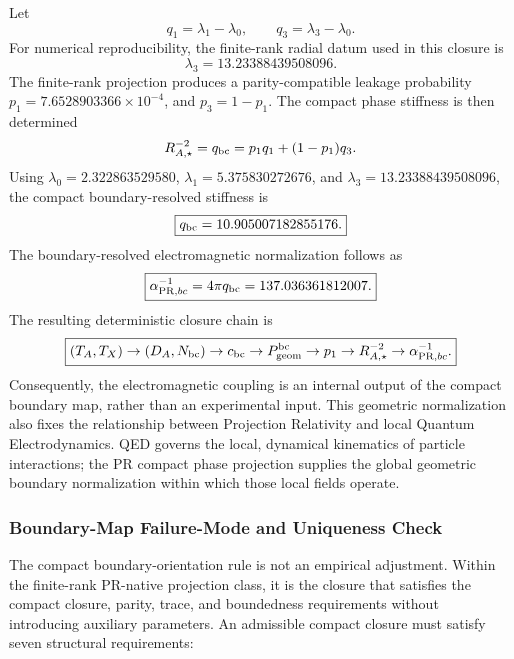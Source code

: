 \documentclass[11pt]{article}
\begin{document}
Let
\begin{equation}
q_1=\lambda_1-\lambda_0,
\qquad
q_3=\lambda_3-\lambda_0.
\end{equation}
For numerical reproducibility, the finite-rank radial datum used in this
closure is
\begin{equation}
\lambda_3
=
13.23388439508096.
\end{equation}
The finite-rank projection produces a parity-compatible leakage probability $p_1 = 7.6528903366\times10^{-4}$, and
$p_3=1-p_1$. The compact phase stiffness is then determined
\begin{equation}
R_{A,\star}^{-2}
=
q_{\rm bc}
=
p_1q_1+(1-p_1)q_3.
\end{equation}
Using $\lambda_0=2.322863529580$, $\lambda_1=5.375830272676$, and $\lambda_3=13.23388439508096$, the compact boundary-resolved stiffness is
\begin{equation}
\boxed{
q_{\rm bc}
=
10.905007182855176.
}
\end{equation}
The boundary-resolved electromagnetic normalization follows as
\begin{equation}
\boxed{
\alpha_{{\rm PR},bc}^{-1}
=
4\pi q_{\rm bc}
=
137.036361812007.
}
\end{equation}
The resulting deterministic closure chain is
\begin{equation}
\boxed{
(T_A,T_X)
\rightarrow
(D_A,N_{\rm bc})
\rightarrow
c_{\rm bc}
\rightarrow
P_{\rm geom}^{\rm bc}
\rightarrow
p_1
\rightarrow
R_{A,\star}^{-2}
\rightarrow
\alpha_{{\rm PR},bc}^{-1}.
}
\end{equation}
Consequently, the electromagnetic coupling is an internal output of the compact
boundary map, rather than an experimental input. This geometric normalization
also fixes the relationship between Projection Relativity and local Quantum
Electrodynamics. QED governs the local, dynamical kinematics of particle
interactions; the PR compact phase projection supplies the global geometric
boundary normalization within which those local fields operate.

\subsubsection{Boundary-Map Failure-Mode and Uniqueness Check}
\label{sec:boundary_map_failure_mode_uniqueness}

The compact boundary-orientation rule is not an empirical adjustment. Within
the finite-rank PR-native projection class, it is the closure that satisfies the
compact closure, parity, trace, and boundedness requirements without introducing
auxiliary parameters. An admissible compact closure must satisfy seven
structural requirements:
\end{document}
